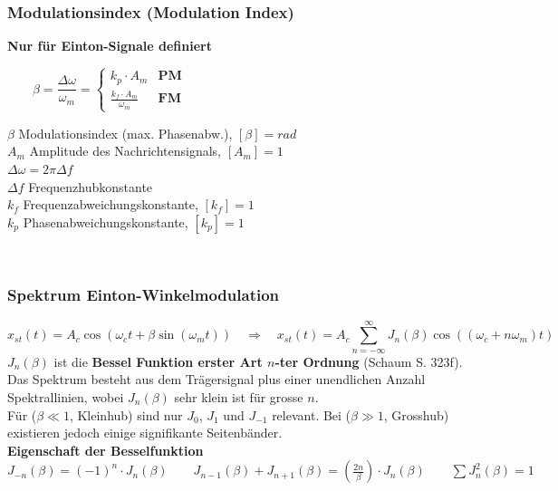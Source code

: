 \subsubsection{Modulationsindex (Modulation Index)}
	\textbf{Nur für Einton-Signale definiert}\\
	\begin{minipage}[t][0.7cm][c]{8cm}
		$ \qquad
		\beta = \dfrac{\Delta \omega}{\omega_m} =
		\begin{cases}
			k_p \cdot A_m & \textbf{PM}  \\
			\frac{k_f \cdot A_m}{\omega_m} & \textbf{FM}
		\end{cases} 
		$
	\end{minipage}
	\begin{minipage}[t][0.7cm][c]{8cm}
		$\beta$ Modulationsindex (max. Phasenabw.), $[\beta] = rad$ \\
		$A_m$ Amplitude des Nachrichtensignals, $[A_m] = 1$ \\
		$\Delta \omega = 2\pi \Delta f$\\
		$\Delta f$ Frequenzhubkonstante \\
		$k_f$ Frequenzabweichungskonstante, $[k_f] = 1$ \\
		$k_p$ Phasenabweichungskonstante, $[k_p] = 1$
	\end{minipage}\\



\subsubsection{Spektrum Einton-Winkelmodulation}
	\begin{equation*}
		x_{st}(t) = A_c \cos(\omega_c t + \beta \sin(\omega_m t)) \quad \Rightarrow \quad 
			\boxed{	x_{st}(t) = A_c \sum\limits_{n=-\infty}^{\infty} J_n(\beta) \cos((\omega_c + n \omega_m)t)}
	\end{equation*}
	\textbf{$J_n(\beta)$} ist die \textbf{Bessel Funktion erster Art $n$-ter Ordnung} (Schaum
	S. 323f). Das Spektrum besteht aus dem Trägersignal plus einer unendlichen Anzahl Spektrallinien,
	wobei $J_n(\beta)$ sehr klein ist für grosse $n$. \\
	Für ($\beta \ll 1$, Kleinhub) sind nur $J_0$, $J_1$ und $ J_{-1}$ relevant. Bei ($\beta \gg 1$,
	Grosshub) existieren jedoch einige signifikante Seitenbänder.\\
	\textbf{Eigenschaft der Besselfunktion}\\
	$J_{-n}(\beta) = (-1)^n \cdot J_n(\beta) \qquad
	J_{n-1}(\beta) + J_{n+1}(\beta) = (\frac{2n}{\beta})\cdot J_n(\beta) \qquad \sum J_n^2(\beta) = 1$

